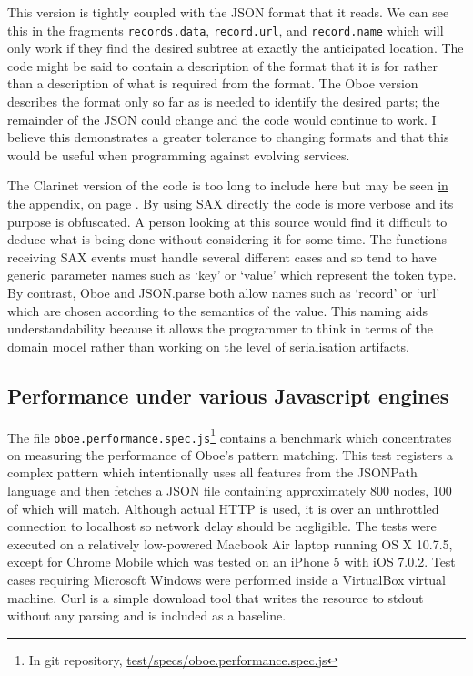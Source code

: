 \documentclass[12pt, ]{article}
\begin{document}
This version is tightly coupled with the JSON format that it reads. We
can see this in the fragments \texttt{records.data},
\texttt{record.url}, and \texttt{record.name} which will only work if
they find the desired subtree at exactly the anticipated location. The
code might be said to contain a description of the format that it is for
rather than a description of what is required from the format. The Oboe
version describes the format only so far as is needed to identify the
desired parts; the remainder of the JSON could change and the code would
continue to work. I believe this demonstrates a greater tolerance to
changing formats and that this would be useful when programming against
evolving services.

The Clarinet version of the code is too long to include here but may be
seen \hyperref[headerux5fbenchmarkClient]{in the appendix}, on page
\pageref{src_benchmarkClient}. By using SAX directly the code is more
verbose and its purpose is obfuscated. A person looking at this source
would find it difficult to deduce what is being done without considering
it for some time. The functions receiving SAX events must handle several
different cases and so tend to have generic parameter names such as
`key' or `value' which represent the token type. By contrast, Oboe and
JSON.parse both allow names such as `record' or `url' which are chosen
according to the semantics of the value. This naming aids
understandability because it allows the programmer to think in terms of
the domain model rather than working on the level of serialisation
artifacts.

\subsection{Performance under various Javascript
engines}\label{performance-under-various-javascript-engines}

The file \texttt{oboe.performance.spec.js}\footnote{In git repository,
  \href{https://github.com/jimhigson/oboe.js/blob/master/test/specs/oboe.performance.spec.js}{test/specs/oboe.performance.spec.js}}
contains a benchmark which concentrates on measuring the performance of
Oboe's pattern matching. This test registers a complex pattern which
intentionally uses all features from the JSONPath language and then
fetches a JSON file containing approximately 800 nodes, 100 of which
will match. Although actual HTTP is used, it is over an unthrottled
connection to localhost so network delay should be negligible. The tests
were executed on a relatively low-powered Macbook Air laptop running OS
X 10.7.5, except for Chrome Mobile which was tested on an iPhone 5 with
iOS 7.0.2. Test cases requiring Microsoft Windows were performed inside
a VirtualBox virtual machine. Curl is a simple download tool that writes
the resource to stdout without any parsing and is included as a
baseline.
\end{document}
